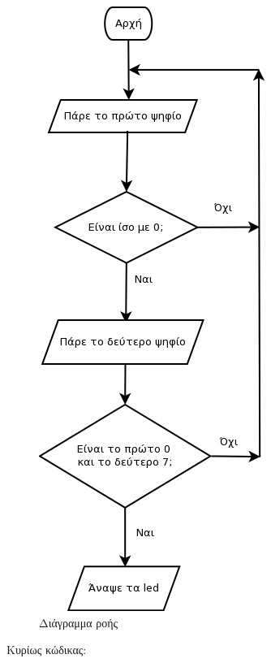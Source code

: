 \section{}

\begin{figure}[H]
	\centering
	\includegraphics[height=0.5\textheight]{files/flowchart.png}
	\caption{Διάγραμμα ροής}
\end{figure}

\noindent Κυρίως κώδικας:
\inputminted[linenos,obeytabs,fontsize=\footnotesize]{c}{files/part3.S}
